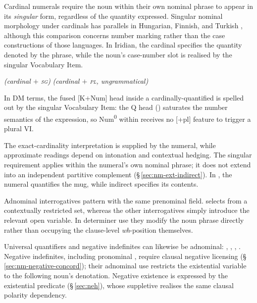 Cardinal numerals require the noun within their own nominal phrase to appear
in its \emph{singular} form, regardless of the quantity expressed. Singular nominal morphology under
cardinals has parallels in Hungarian, Finnish, and Turkish
\cite[§\,1]{marti2020}, although this comparison concerns number marking
rather than the case constructions of those languages. In Iridian, the cardinal
specifies the quantity denoted by the phrase, while the noun's case-number slot
is realised by the singular Vocabulary Item.

\pex
\a {}  \hfill\textit{(cardinal $+$ \textsc{sg})}
\a {} \hfill\textit{(cardinal $+$ \textsc{pl}, ungrammatical)}
\xe

\noindent In DM terms, the fused [K$+$Num] head inside a cardinally-quantified
 is spelled out by the singular Vocabulary Item: the Q head
() saturates the number semantics of the expression, so
Num\textsuperscript{0} within  receives no [+pl] feature to trigger
a plural VI.

The exact-cardinality interpretation is supplied by the numeral, while
approximate readings depend on intonation and contextual hedging. The
singular requirement applies within the numeral's own nominal phrase;
it does not extend into an independent partitive complement
(§\,\ref{sec:nm-ext-indirect}). In 
, the numeral quantifies the mug, while indirect
 specifies its contents.

Adnominal interrogatives pattern with the same prenominal field. 
selects from a contextually restricted set, whereas the other interrogatives
simply introduce the relevant open variable. In determiner use they modify the
noun phrase directly rather than occupying the clause-level \emph{wh}-position
themselves.

\pex
\a {} 
\a {} 
\xe

Universal quantifiers and negative indefinites can likewise be adnominal: 
,  , 
,  . Negative indefinites,
including pronominal  , require clausal negative
licensing (§\,\ref{sec:nm-negative-concord}); their adnominal use restricts
the existential variable to the following noun's denotation. Negative
existence is expressed by the existential predicate
(§\,\ref{sec:neh}), whose suppletive  realises the same clausal
polarity dependency.


